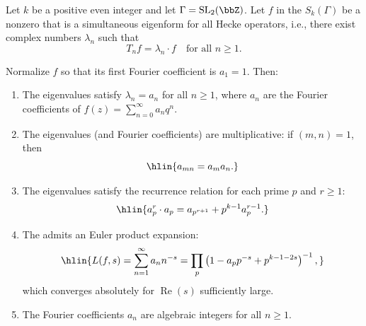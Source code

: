 \begin{corollary} \label{corollary:euler_product_for_l_function_of_hecke_eigenform}
Let $k$ be a positive even integer and let $\Gamma = \mathrm{SL}_2(\bbZ)$. Let $f$ in the  $S_k(\Gamma)$ be a nonzero  that is a simultaneous eigenform for all Hecke operators, i.e., there exist complex numbers $\lambda_n$ such that
$$T_n f = \lambda_n \cdot f \quad \text{for all } n \geq 1.$$

Normalize $f$ so that its first Fourier coefficient is $a_1 = 1$. Then:

\begin{enumerate}
    \item The eigenvalues satisfy $\lambda_n = a_n$ for all $n \geq 1$, where $a_n$ are the Fourier coefficients of $f(z) = \sum_{n=0}^\infty a_n q^n$.

    \item The eigenvalues (and Fourier coefficients) are multiplicative: if $(m, n) = 1$, then
    $$\hlin{a_{mn} = a_m a_n.}$$

    \item The eigenvalues satisfy the recurrence relation for each prime $p$ and $r \geq 1$:
    $$\hlin{a_p^r \cdot a_p = a_{p^{r+1}} + p^{k-1} a_p^{r-1}.}$$

    \item The  admits an Euler product expansion:
    $$\hlin{L(f,s) = \sum_{n=1}^\infty a_n n^{-s} = \prod_p \left(1 - a_p p^{-s} + p^{k-1-2s}\right)^{-1},}$$
    which converges absolutely for $\operatorname{Re}(s)$ sufficiently large.

    \item The Fourier coefficients $a_n$ are algebraic integers for all $n \geq 1$.
\end{enumerate}
\end{corollary}

